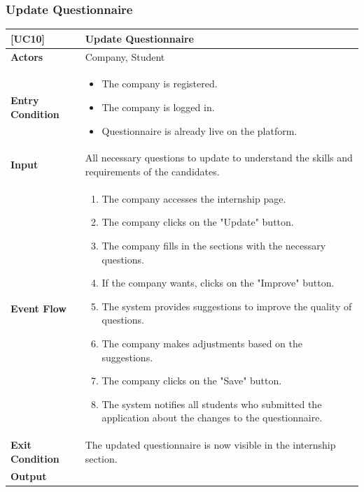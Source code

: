 \subsubsection*{Update Questionnaire}
\begin{table}[H]
    \centering
    \renewcommand{\arraystretch}{1.5}
    \begin{tabular}{|p{4cm}|p{11cm}|}
    \hline
    \rowcolor{bluepoli!40}
    \textbf{[UC10]} & \textbf{Update Questionnaire} \\ \hline \hline
    \textbf{Actors} & Company, Student \\ \hline
    \textbf{Entry Condition} & 
    {\setlength{\leftmargini}{1.1em}
    \begin{itemize}
        \item The company is registered.
        \item The company is logged in.
        \item Questionnaire is already live on the platform.
    \end{itemize}} \\ \hline
    \textbf{Input} & 
    All necessary questions to update to understand the skills and requirements of the candidates. \\ \hline
    \textbf{Event Flow} & 
    {\setlength{\leftmargini}{1.4em}
    \begin{enumerate}
        \item The company accesses the internship page.
        \item The company clicks on the "Update" button.
        \item The company fills in the sections with the necessary questions.
        \item If the company wants, clicks on the "Improve" button.
        \item The system provides suggestions to improve the quality of questions.
        \item The company makes adjustments based on the suggestions.
        \item The company clicks on the "Save" button.
        \item The system notifies all students who submitted the application about the changes to the questionnaire.
    \end{enumerate}} \\ \hline
    \textbf{Exit Condition} & 
    The updated questionnaire is now visible in the internship section. \\ \hline
    \textbf{Output} & 

\end{tabular}
\end{table}
